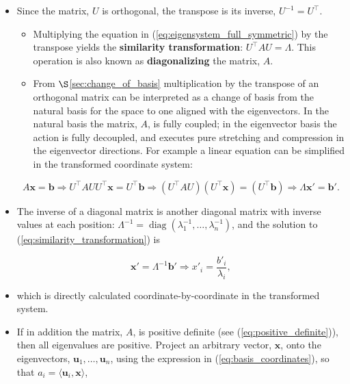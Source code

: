 \documentclass[12pt, twoside, draft]{article}
\begin{document}
\begin{itemize}[noitemsep]
\item Since the matrix, $U$ is orthogonal, the transpose is its inverse, $U^{-1} = U^\top$.  
\begin{itemize}[noitemsep]
\item Multiplying the equation in (\ref{eq:eigensystem_full_symmetric}) by the transpose yields the \textbf{similarity transformation}: $U^\top A U = \Lambda$.  This operation is also known as \textbf{diagonalizing} the matrix, $A$.
\item From $\S$\ref{sec:change_of_basis} multiplication by the transpose of an orthogonal matrix can be interpreted as a change of basis from the natural basis for the space to one aligned with the eigenvectors. In the natural basis the matrix, $A$, is fully coupled; in the eigenvector basis the action is fully decoupled, and executes pure stretching and compression in the eigenvector directions. For example a linear equation can be simplified in the transformed coordinate system:
\end{itemize}
\begin{equation}\label{eq:similarity_transformation_symmetric}
A \mathbf{x} = \mathbf{b} \Rightarrow U^\top A U U^\top \mathbf{x} = U^\top \mathbf{b} \Rightarrow (U^\top A U)(U^\top \mathbf{x}) = (U^\top \mathbf{b}) \Rightarrow \Lambda \mathbf{x}' = \mathbf{b}'.
\end{equation}

\item[] The inverse of a diagonal matrix is another diagonal matrix with inverse values at each position: $\Lambda^{-1} = \operatorname{diag}(\lambda_1^{-1}, \ldots, \lambda_n^{-1})$, and the solution to (\ref{eq:similarity_transformation}) is

\begin{equation}\label{eq:solution_orthogonal_basis}
\mathbf{x}' = \Lambda^{-1} \mathbf{b}' \Rightarrow x'_i = \frac{b'_i}{\lambda_i},
\end{equation}

\item[] which is directly calculated coordinate-by-coordinate in the transformed system.

\item If in addition the matrix, $A$, is positive definite (see (\ref{eq:positive_definite})), then all eigenvalues are positive.  Project an arbitrary vector, $\mathbf{x}$, onto the eigenvectors, $\mathbf{u}_1, \ldots, \mathbf{u}_n$, using the expression in (\ref{eq:basis_coordinates}), so that $a_i = \langle \mathbf{u}_i, \mathbf{x} \rangle$,
\end{itemize}
\end{document}
